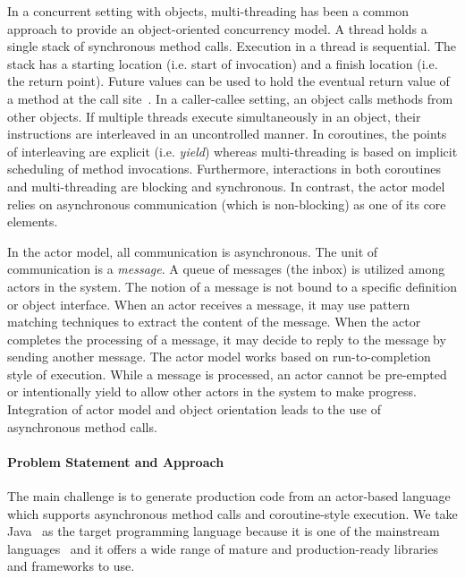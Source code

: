 In a concurrent setting with objects, multi-threading has been a common approach to provide an object-oriented concurrency model.
A thread holds a single stack of synchronous method calls.
Execution in a thread is sequential.
The stack has a starting location (i.e. start of invocation) and a finish location (i.e. the return point).
Future values can be used to hold the eventual return value of a method at the call site~\cite{DBLP:books/daglib/0092230,de2007complete}.
In a caller-callee setting, an object calls methods from other objects.
If multiple threads execute simultaneously in an object, their instructions are
interleaved in an uncontrolled manner.
In coroutines, the points of interleaving are explicit (i.e. \emph{yield}) 
whereas multi-threading is based on implicit scheduling of method invocations.
Furthermore, interactions in both coroutines and multi-threading are blocking and synchronous.
In contrast, the actor model relies on asynchronous communication (which is non-blocking)
as one of its core elements.

In the actor model, all communication is asynchronous.
The unit of communication is a \emph{message}.
A queue of messages (the inbox) is utilized among actors in the system.
The notion of a message is not bound to a specific definition or object interface.
When an actor receives a message, it may use pattern matching techniques to extract the content of the message.
When the actor completes the processing of a message, it may decide to reply to the message by sending another message.
The actor model works based on run-to-completion style of execution.
While a message is processed, an actor cannot be pre-empted or intentionally yield to allow other actors in the system to make progress.
Integration of actor model and object orientation leads to the use of asynchronous method calls.

\paragraph*{Problem Statement and Approach}
The main challenge is to generate production code from an actor-based language which supports asynchronous method calls and coroutine-style execution.
We take Java~\cite{gosling2000java} as the target programming language because it is one of the mainstream languages~\cite{tiobe} and it offers a wide range of mature and production-ready libraries and frameworks to use. 


